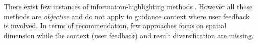 
There exist few instances of information-highlighting methods \cite{Liang2010,Robinson2011}. However all these methods are {\em objective} and do not apply to guidance context where user feedback is involved.  In terms of recommendation, few approaches focus on spatial dimension
\cite{Bao2015,Levandoski:2012}
while the context (user feedback) and result diversification are missing.




